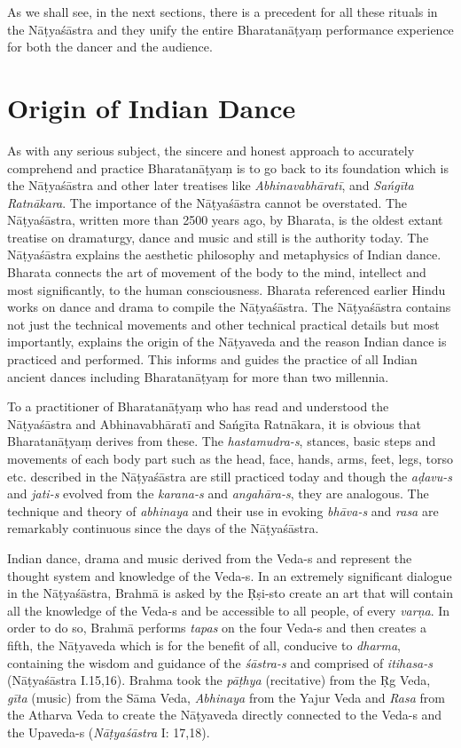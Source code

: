 As we shall see, in the next sections, there is a precedent for all these rituals in the Nāṭyaśāstra and they unify the entire Bharatanāṭyaṃ performance experience for both the dancer and the audience.


\section*{Origin of Indian Dance}

As with any serious subject, the sincere and honest approach to accurately comprehend and practice Bharatanāṭyaṃ is to go back to its foundation which is the Nāṭyaśāstra and other later treatises like \textit{Abhinavabhāratī}, and \textit{Sańgīta Ratnākara}. The importance of the Nāṭyaśāstra cannot be overstated. The Nāṭyaśāstra, written more than 2500 years ago, by Bharata, is the oldest extant treatise on dramaturgy, dance and music and still is the authority today. The Nāṭyaśāstra explains the aesthetic philosophy and metaphysics of Indian dance. Bharata connects the art of movement of the body to the mind, intellect and most significantly, to the human consciousness. Bharata referenced earlier Hindu works on dance and drama to compile the Nāṭyaśāstra. The Nāṭyaśāstra contains not just the technical movements and other technical practical details but most importantly, explains the origin of the Nāṭyaveda and the reason Indian dance is practiced and performed. This informs and guides the practice of all Indian ancient dances including Bharatanāṭyaṃ for more than two millennia. 

To a practitioner of Bharatanāṭyaṃ who has read and understood the Nāṭyaśāstra and Abhinavabhāratī and Sańgīta Ratnākara, it is obvious that Bharatanāṭyaṃ derives from these. The \textit{hastamudra-s}, stances, basic steps and movements of each body part such as the head, face, hands, arms, feet, legs, torso etc. described in the Nāṭyaśāstra are still practiced today and though the \textit{aḍavu-s }and \textit{jati-s }evolved from the \textit{karana-s} and \textit{angahāra-s}, they are analogous. The technique and theory of \textit{abhinaya} and their use in evoking \textit{bhāva-s} and \textit{rasa }are remarkably continuous since the days of the Nāṭyaśāstra.

Indian dance, drama and music derived from the Veda-s and represent the thought system and knowledge of the Veda-s. In an extremely significant dialogue in the Nāṭyaśāstra, Brahmā is asked by the Ṛṣi-s\break to create an art that will contain all the knowledge of the Veda-s and be accessible to all people, of every \textit{varṇa}. In order to do so, Brahmā performs \textit{tapas} on the four Veda-s and then creates a fifth, the Nāṭyaveda which is for the benefit of all, conducive to \textit{dharma}, containing the wisdom and guidance of the \textit{śāstra-s }and comprised of \textit{itihasa-s} (Nāṭyaśāstra I.15,16). Brahma took the \textit{pāṭhya} (recitative) from the Ṛg Veda, \textit{gīta} (music) from the Sāma Veda, \textit{Abhinaya} from the Yajur Veda and \textit{Rasa} from the Atharva Veda to create the Nāṭyaveda directly connected to the Veda-s and the Upaveda-s (\textit{Nāṭyaśāstra} I: 17,18).

